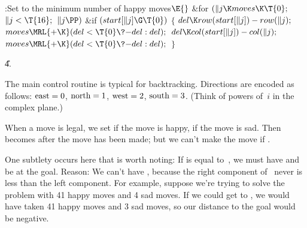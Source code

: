 \B{}:Set  to the minimum number of happy moves\X${}\E{}$\6
\&{for} ${}(\|j\K\\{moves}\K\T{0};{}$ ${}\|j<\T{16};{}$ ${}\|j\PP){}$\1\6
\&{if} ${}(\\{start}[\|j]\G\T{0}){}$\5
${}\{{}$\1\6
${}\\{del}\K\\{row}(\\{start}[\|j])-\\{row}(\|j);{}$\6
${}\\{moves}\MRL{+{\K}}(\\{del}<\T{0}\?{-}\\{del}:\\{del});{}$\6
${}\\{del}\K\\{col}(\\{start}[\|j])-\\{col}(\|j);{}$\6
${}\\{moves}\MRL{+{\K}}(\\{del}<\T{0}\?{-}\\{del}:\\{del});{}$\6
\4${}\}{}$\2\2\par
\U4.\fi

The main control routine is typical for backtracking.
Directions are encoded as follows: $\rm east=0$, $\rm north=1$,
$\rm west=2$, $\rm south=3$. (Think of powers of~$i$ in the complex
plane.)

When a move is legal, we set  if the move is happy,
 if the move is sad. Then  becomes  after
the move has been made; but we can't make the move if .

One subtlety occurs here that is worth noting: If  is
equal to~, we must have  and be at the goal.
Reason: We can't have , because the right component of~%
never is less than the left component.
For example, suppose we're trying
to solve the problem with 41 happy moves and 4 sad moves.
If we could get to , we would have taken 41 happy moves
and 3 sad moves, so our distance to the goal would be negative.

